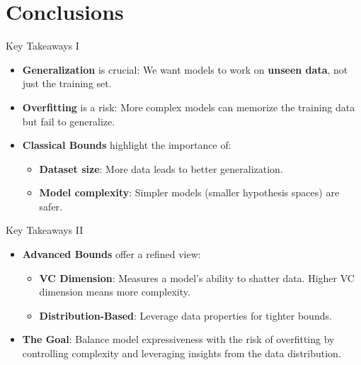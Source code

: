 \documentclass[
  ignorenonframetext,
]{beamer}
\providecommand{\tightlist}{%
  \setlength{\itemsep}{0pt}\setlength{\parskip}{0pt}}\usepackage{longtable,booktabs,array}
\begin{document}
\section{Conclusions}\label{conclusions}

\begin{frame}{Key Takeaways I}
\label{key-takeaways-i}
\begin{itemize}
\tightlist
\item
  \textbf{Generalization} is crucial: We want models to work on
  \textbf{unseen data}, not just the training set.
\item
  \textbf{Overfitting} is a risk: More complex models can memorize the
  training data but fail to generalize.
\item
  \textbf{Classical Bounds} highlight the importance of:

  \begin{itemize}
  \tightlist
  \item
    \textbf{Dataset size}: More data leads to better generalization.
  \item
    \textbf{Model complexity}: Simpler models (smaller hypothesis
    spaces) are safer.
  \end{itemize}
\end{itemize}
\end{frame}

\begin{frame}{Key Takeaways II}
\label{key-takeaways-ii}
\begin{itemize}
\tightlist
\item
  \textbf{Advanced Bounds} offer a refined view:

  \begin{itemize}
  \tightlist
  \item
    \textbf{VC Dimension}: Measures a model's ability to shatter data.
    Higher VC dimension means more complexity.
  \item
    \textbf{Distribution-Based}: Leverage data properties for tighter
    bounds.
  \end{itemize}
\item
  \textbf{The Goal}: Balance model expressiveness with the risk of
  overfitting by controlling complexity and leveraging insights from the
  data distribution.
\end{itemize}
\end{frame}
\end{document}
